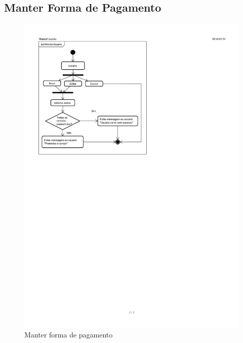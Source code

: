 \documentclass[chapter=TITLE,12pt,oneside,a4paper,english,french,sumario=tradicional,spanish,brazil,]{abntex2}
\begin{document}
\subsection{Manter Forma de Pagamento}
\begin{figure}[h]\centering
	\includegraphics[scale=1.63]{usuario.pdf}\caption{Manter forma de pagamento}
\end{figure}

\newpage
\end{document}
